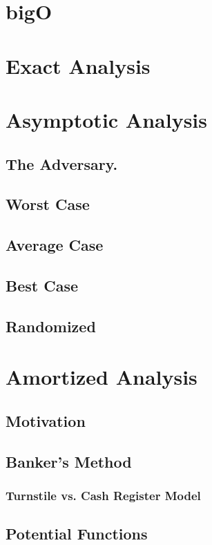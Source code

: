 \documentclass[12pt, letterpaper]{book}
\begin{document}
	\section{bigO}
	\section{Exact Analysis}

	\section{Asymptotic Analysis}

		\subsection{The Adversary.}
		\subsection{Worst Case}
		\subsection{Average Case}
		\subsection{Best Case}
		\subsection{Randomized}
	
	\section{Amortized Analysis} \label{amortized analysis}
		\subsection{Motivation}
		\subsection{Banker's Method}
		\subsubsection{Turnstile vs. Cash Register Model}
		\subsection{Potential Functions}
\end{document}
